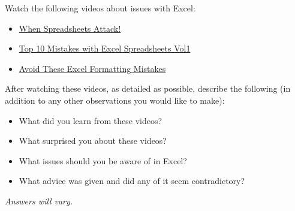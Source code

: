 \documentclass[11pt,letterpaper]{article}
\begin{document}
 Watch the following videos about issues with Excel:
	\begin{itemize}
	\item \href{https://www.youtube.com/watch?v=yb2zkxHDfUE&ab_channel=Stand-upMaths}{When Spreadsheets Attack!}
	\item \href{https://www.youtube.com/watch?v=3tkz5MNg4FA&ab_channel=QIMacros}{Top 10 Mistakes with Excel Spreadsheets Vol1}
	\item \href{https://www.youtube.com/watch?v=ujExCcncT6k&ab_channel=Pete-HowToAnalyst}{Avoid These Excel Formatting Mistakes}
	\end{itemize}
After watching these videos, as detailed as possible, describe the following (in addition to any other observations you would like to make):
	\begin{itemize}
	\item What did you learn from these videos?
	\item What surprised you about these videos?
	\item What issues should you be aware of in Excel?
	\item What advice was given and did any of it seem contradictory?
	\end{itemize} \par\vfill

\begin{center}
{\itshape Answers will vary.}
\end{center} \vfill
\end{document}
